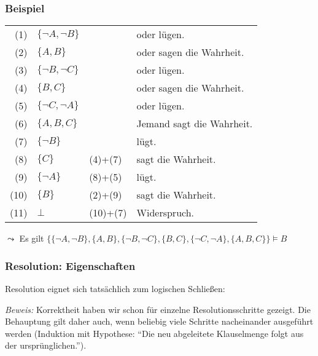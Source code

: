 \documentclass[aspectratio=1610,onlymath]{beamer}
\begin{document}
\begin{frame}\frametitle{Beispiel}

\begin{tabular}{rlll}
(1) & $\{\neg A, \neg B\}$ && \textcolor{devilscss}{\Aname{} oder \Bname{} lügen.}\\
(2) & $\{A, B\}$  && \textcolor{devilscss}{\Aname{} oder \Bname{} sagen die Wahrheit.} \\
(3) & $\{\neg B, \neg C\}$  && \textcolor{devilscss}{\Bname{} oder \Cname{} lügen.} \\
(4) & $\{B, C\}$ && \textcolor{devilscss}{\Bname{} oder \Cname{} sagen die Wahrheit.} \\
(5) & $\{\neg C, \neg A\}$ && \textcolor{devilscss}{\Cname{} oder \Aname{} lügen.} \\
(6) & $\{A, B, C\}$ && \textcolor{devilscss}{Jemand sagt die Wahrheit.}  \\
(7) & $\{\neg B\}$ && \textcolor{devilscss}{\Bname{} lügt.} \\\pause
(8) & $\{C\}$   &  (4)+(7) & \textcolor{devilscss}{\Cname{} sagt die Wahrheit.} \\\pause
(9) & $\{\neg A\}$ & (8)+(5) & \textcolor{devilscss}{\Aname{} lügt.}\\\pause
(10) & $\{B\}$  & (2)+(9) & \textcolor{devilscss}{\Bname{} sagt die Wahrheit.} \\\pause
(11) & $\bot$ & (10)+(7) & \textcolor{devilscss}{Widerspruch.} 
\end{tabular}\bigskip

$\leadsto$ Es gilt $\{\{\neg A, \neg B\},\{A, B\},\{\neg B, \neg C\},\{B, C\},\{\neg C, \neg A\},\{A, B, C\}\}\models B$

\end{frame}

\begin{frame}[t]\frametitle{Resolution: Eigenschaften}

Resolution eignet sich tatsächlich zum logischen Schließen:\medskip

\pause

\emph{Beweis:} \alert{Korrektheit} haben wir schon für einzelne Resolutionsschritte gezeigt.
Die Behauptung gilt daher auch, wenn beliebig viele Schritte nacheinander ausgeführt werden (Induktion
mit Hypothese: "`Die neu abgeleitete Klauselmenge folgt aus der ursprünglichen."').

\end{frame}
\end{document}
